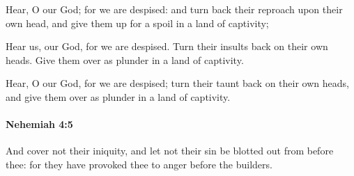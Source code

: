 			\begin{versebox}
					\item[BHS] 
					\item[LXX] 
					\item[ASV] Hear, O our God; for we are despised: and turn back their reproach upon their own head, and give them up for a spoil in a land of captivity;
					\item[NIV] Hear us, our God, for we are despised. Turn their insults back on their own heads. Give them over as plunder in a land of captivity.
					\item[NRSV] Hear, O our God, for we are despised; turn their taunt back on their own heads, and give them over as plunder in a land of captivity.
			\end{versebox}

		\paragraph{Nehemiah 4:5} %
			\label{NEHEMIAH-4-5}

			And cover not their iniquity, and let not their sin be blotted out from before thee: for they have provoked thee to anger before the builders.

